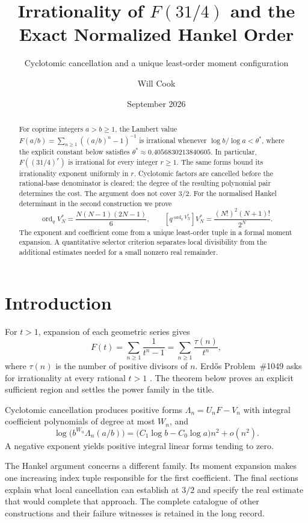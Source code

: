 \documentclass[11pt]{article}
\title{Irrationality of $F(31/4)$ and the\\Exact Normalized Hankel Order}
\subtitle{Cyclotomic cancellation and a unique least-order moment configuration}
\author{Will Cook}
\date{September 2026}
\begin{document}
\maketitle
\noteprovenance

\begin{abstract}
For coprime integers $a>b\ge1$, the Lambert value
$F(a/b)=\sum_{n\ge1}((a/b)^n-1)^{-1}$ is irrational whenever
$\log b/\log a<\theta^*$, where the explicit constant below satisfies
$\theta^*\approx0.4056830213840605$.
In particular, $F((31/4)^r)$ is irrational for every integer $r\ge1$.
The same forms bound its irrationality exponent uniformly in $r$.
Cyclotomic factors are cancelled before the rational-base denominator is
cleared; the degree of the resulting polynomial pair determines the cost.
The argument does not cover $3/2$.
For the normalised Hankel determinant in the second construction we prove
\[
 \operatorname{ord}_qV_N^*=\frac{N(N-1)(2N-1)}6,
 \qquad [q^{\operatorname{ord}_qV_N^*}]V_N^*
       =\frac{(N!)^2(N+1)!}{2^N}.
\]
The exponent and coefficient come from a unique least-order tuple in a formal
moment expansion.  A quantitative selector criterion separates local
divisibility from the additional estimates needed for a small nonzero real
remainder.
\end{abstract}

\section{Introduction}\label{sec:problem}

For $t>1$, expansion of each geometric series gives
\[
 F(t)=\sum_{n\ge1}\frac1{t^n-1}
     =\sum_{n\ge1}\frac{\tau(n)}{t^n},
\]
where $\tau(n)$ is the number of positive divisors of $n$.
Erd\H{o}s Problem~\#1049 asks for irrationality at every rational $t>1$
\cite[p.~102]{erdos1988}.  The theorem below proves an explicit sufficient
region and settles the power family in the title.

Cyclotomic cancellation produces positive forms $\Lambda_n=U_nF-V_n$
with integral coefficient polynomials of degree at most $W_n$, and
\[
 \log\!\bigl(b^{W_n}\Lambda_n(a/b)\bigr)
 =\bigl(C_1\log b-C_0\log a\bigr)n^2+o(n^2).
\]
A negative exponent yields positive integral linear forms tending to zero.

The Hankel argument concerns a different family.  Its moment expansion makes
one increasing index tuple responsible for the first coefficient.  The final
sections explain what local cancellation can establish at $3/2$ and specify
the real estimate that would complete that approach.  The complete catalogue
of other constructions and their failure witnesses is retained in the long
record.
\end{document}
